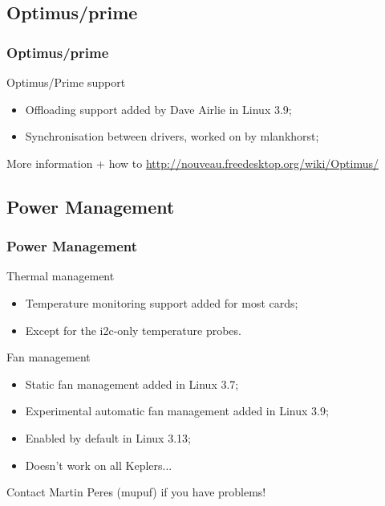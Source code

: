 \documentclass[11pt,english,compress]{beamer}
\begin{document}
\subsection{Optimus/prime}

\begin{frame}
	\frametitle{Optimus/prime}

	\begin{block}{Optimus/Prime support}
		\begin{itemize}
			\item Offloading support added by Dave Airlie in Linux 3.9;
			\item Synchronisation between drivers, worked on by mlankhorst;
		\end{itemize}
	\end{block}

	\begin{block}{More information + how to}
		\url{http://nouveau.freedesktop.org/wiki/Optimus/}
	\end{block}
\end{frame}

\subsection{Power Management}

\begin{frame}
	\frametitle{Power Management}

	\begin{block}{Thermal management}
		\begin{itemize}
			\item Temperature monitoring support added for most cards;
			\item Except for the i2c-only temperature probes.
		\end{itemize}
	\end{block}

	\begin{block}{Fan management}
		\begin{itemize}
			\item Static fan management added in Linux 3.7;
			\item Experimental automatic fan management added in
Linux 3.9;
			\item Enabled by default in Linux 3.13;
			\item Doesn't work on all Keplers...
		\end{itemize}
	\end{block}

	\begin{block}{}
		Contact Martin Peres (mupuf) if you have problems!
	\end{block}
\end{frame}
\end{document}
